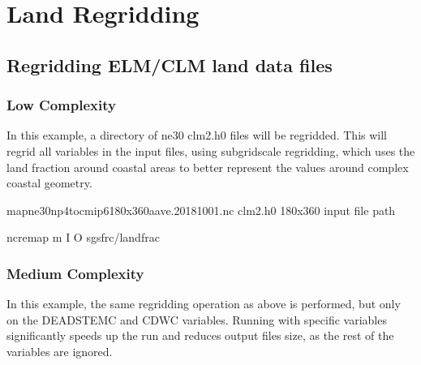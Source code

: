 \documentclass[letterpaper,10pt,english]{sphinxmanual}
\begin{document}
\chapter{Land Regridding}
\label{\detokenize{lnd_regrid:land-regridding}}\label{\detokenize{lnd_regrid:lnd-regrid}}\label{\detokenize{lnd_regrid::doc}}

\section{Regridding ELM/CLM land data files}
\label{\detokenize{lnd_regrid:regridding-elm-clm-land-data-files}}

\subsection{Low Complexity}
\label{\detokenize{lnd_regrid:low-complexity}}
In this example, a directory of ne30 clm2.h0 files will be regridded. This will regrid all variables in the input files, using sub\sphinxhyphen{}grid\sphinxhyphen{}scale
regridding, which uses the land fraction around coastal areas to better represent the values around complex coastal geometry.

\begin{sphinxVerbatim}[commandchars=\\\{\}]
map\PYGZus{}ne30np4\PYGZus{}to\PYGZus{}cmip6\PYGZus{}180x360\PYGZus{}aave.20181001.nc   
clm2.h0                                          
180x360                                         
\PYGZlt{}input file path\PYGZgt{}                             

ncremap \PYGZhy{}m  \PYGZhy{}I  \PYGZhy{}O  \PYGZhy{}\PYGZhy{}sgs\PYGZus{}frc/landfrac
\end{sphinxVerbatim}


\subsection{Medium Complexity}
\label{\detokenize{lnd_regrid:medium-complexity}}
In this example, the same regridding operation as above is performed, but only on the DEADSTEMC and CDWC variables.
Running with specific variables significantly speeds up the run and reduces output files size, as the rest of the variables are ignored.
\end{document}
